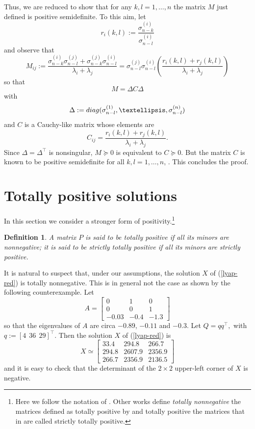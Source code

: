 \documentclass[10pt,a4paper]{amsart}
\newcommand{\tp}{^{\top}}
\newcommand{\beq}{\begin{equation}}
\newcommand{\eeq}{\end{equation}}
\def\bmat{\left[ \begin{array}}
\def\emat{\end{array} \right]}
\newtheorem{definition}{Definition}[section]
\begin{document}
Thus, we are reduced to show that for any $k,l=1,\dots,n$ the matrix $M$ just defined is positive semidefinite.
To this aim, 
let $$r_i(k,l):= \frac{\sigma_{n-k}^{(i)}}{\sigma_{n-l}^{(i)}}$$
and observe that
$$M_{ij}:=\frac{\sigma_{n-k}^{(i)}\sigma_{n-l}^{(j)}+\sigma_{n-k}^{(j)}\sigma_{n-l}^{(i)}}{\lambda_i +\lambda_j}=\sigma_{n-l}^{(j)}\sigma_{n-l}^{(i)} \left( \frac{r_i(k,l) + r_j(k,l)}{\lambda_i + \lambda_j} \right) $$
so that
$$M=\Delta C\Delta$$
with $$\Delta:={\rm diag}(\sigma_{n-l}^{(1)}, \dots, \sigma_{n-l}^{(n)})$$
and
$C$ is a Cauchy-like matrix whose elements are
\beq\label{Cauchy-likemat}
C_{ij}=\frac{r_i(k,l) + r_j(k,l)}{\lambda_i + \lambda_j}.
\eeq
Since $\Delta=\Delta\tp$ is nonsingular, $M\succeq 0$ is equivalent to $C \succeq 0$.
But the matrix $C$ is known to be positive semidefinite for all $k,l=1,\dots,n$, \cite{ferrante2026positivityclasscauchylikematrices}.
This concludes the proof. 








\section{Totally positive solutions}

In this section we consider a stronger form of positivity.\footnote{Here we follow the notation of \cite{Pinkus-TPM}. Other works define {\em totally
nonnegative} the matrices defined as totally positive by \cite{Pinkus-TPM}
and totally positive the matrices that in \cite{Pinkus-TPM} are called 
strictly
totally positive.}

\begin{definition}
A matrix $P$ is said to be {\em totally positive} if
all its minors are nonnegative; it is said to be {\em strictly
totally positive} if all its minors are strictly positive.
\end{definition}

It is natural to suspect that, under our assumptions, the solution $X$
of (\ref{lyap-red}) is totally nonnegative.
This is in general not the case  as
shown by the following counterexample.
Let  
$$
A=\bmat{ccc}0&    1& 0\\
         0   &       0   &  1\\
   -0.03  &-0.4   & -1.3\emat
   $$
so that the eigenvalues of $A$ are circa $-0.89$,
$-0.11$ and
$-0.3$.
Let $Q=qq\tp,$ with 
$q:=[4\ \ 36\ \ 29]\tp$.
Then the solution $X$ of (\ref{lyap-red}) is
$$
X\simeq\bmat{ccc}
33.4  &  294.8  &  266.7\\
294.8  &  2607.9  &  2356.9\\
266.7  &  2356.9  &  2136.5\emat
$$
and it is easy to check that the determinant of the $2\times 2$ upper-left corner of $X$ is negative.
\end{document}
